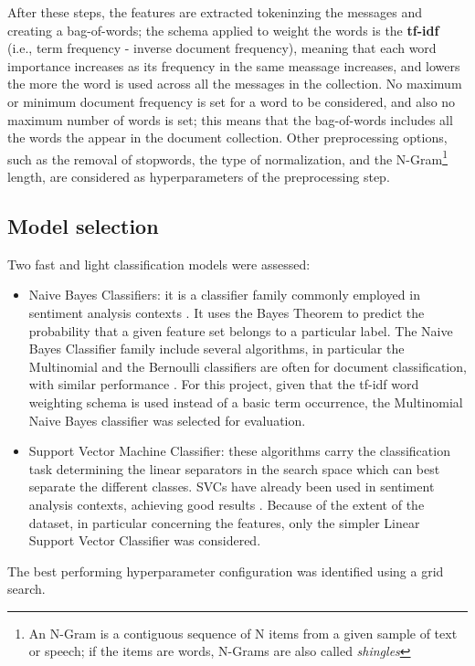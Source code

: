 \documentclass[conference]{IEEEtran}
\begin{document}
After these steps, the features are extracted tokeninzing the messages and creating a bag-of-words; the schema applied to weight the words is the \textbf{tf-idf} (i.e., term frequency - inverse document frequency), meaning that each word importance increases as its frequency in the same meassage increases, and lowers the more the word is used across all the messages in the collection. No maximum or minimum document frequency is set for a word to be considered, and also no maximum number of words is set; this means that the bag-of-words includes all the words the appear in the document collection. Other preprocessing options, such as the removal of stopwords, the type of normalization, and the N-Gram\footnote{An N-Gram is a contiguous sequence of N items from a given sample of text or speech; if the items are words, N-Grams are also called \textit{shingles}} length, are considered as hyperparameters of the preprocessing step.
\subsection{Model selection}
Two fast and light classification models were assessed: 
\begin{itemize}
    \item Naive Bayes Classifiers: it is a classifier family commonly employed in sentiment analysis contexts \cite{MEDHAT20141093}. It uses the Bayes Theorem to predict the probability that a given feature set belongs to a particular label. The Naive Bayes Classifier family include several algorithms, in particular the Multinomial and the Bernoulli classifiers are often for document classification, with similar performance \cite{8776800}. For this project, given that the tf-idf word weighting schema is used instead of a basic term occurrence, the Multinomial Naive Bayes classifier was selected for evaluation.
    \item Support Vector Machine Classifier: these algorithms carry the classification task determining the linear separators in the search space which can best separate the different classes. SVCs have already been used in sentiment analysis contexts, achieving good results \cite{6914200}. Because of the extent of the dataset, in particular concerning the features, only the simpler Linear Support Vector Classifier was considered. 
\end{itemize}
The best performing hyperparameter configuration was identified using a grid search. 
\end{document}
